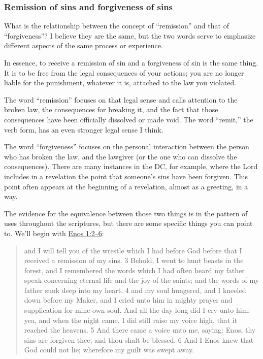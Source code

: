 	\subsubsection{Remission of sins and forgiveness of sins}
		\label{REMISSION-forgiveness}
		
		What is the relationship between the concept of ``remission'' and that of ``forgiveness''? I believe they are the same, but the two words serve to emphasize different aspects of the same process or experience.
		
		In essence, to receive a remission of sin and a forgiveness of sin is the same thing. It is to be free from the legal consequences of your actions; you are no longer liable for the punishment, whatever it is, attached to the law you violated.
		
		The word ``remission'' focuses on that legal sense and calls attention to the broken law, the consequences for breaking it, and the fact that those consequences have been officially dissolved or made void. The word ``remit,'' the verb form, has an even stronger legal sense I think.
		
		The word ``forgiveness'' focuses on the personal interaction between the person who has broken the law, and the lawgiver (or the one who can dissolve the consequences). There are many instances in the DC, for example, where the Lord includes in a revelation the point that someone's sins have been forgiven. This point often appears at the beginning of a revelation, almost as a greeting, in a way.
		
		The evidence for the equivalence between those two things is in the pattern of uses throughout the scriptures, but there are some specific things you can point to. We'll begin with \hyperref[ENOS-1-2]{Enos 1:2--6}:

			\begin{quote}
				and I will tell you of the wrestle which I had before God before that I received a remission of my sins. 3 Behold, I went to hunt beasts in the forest, and I remembered the words which I had often heard my father speak concerning eternal life and the joy of the saints; and the words of my father sunk deep into my heart, 4 and my soul hungered, and I kneeled down before my Maker, and I cried unto him in mighty prayer and supplication for mine own soul. And all the day long did I cry unto him; yea, and when the night came, I did still raise my voice high, that it reached the heavens. 5 And there came a voice unto me, saying: Enos, thy sins are forgiven thee, and thou shalt be blessed. 6 And I Enos knew that God could not lie; wherefore my guilt was swept away.
			\end{quote}
			
